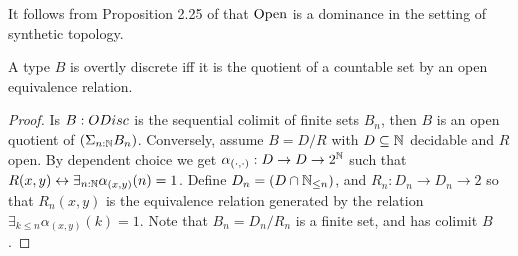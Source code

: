 \begin{remark}\label{OpenDominance}
  It follows from  Proposition 2.25 of \cite{SyntheticTopologyLesnik} that 
  $\mathrm{Open}$ is a dominance in the setting of synthetic topology. 
\end{remark}

\begin{lemma}\label{OdiscQuotientCountableByOpen}\label{ODiscEqualityOpen}
  A type $B$ is overtly discrete iff it is the quotient of a countable set by an open equivalence relation. 
\end{lemma}
\begin{proof}
  Is $B:\ODisc$ is the sequential colimit of finite sets $B_n$, 
  then $B$ is an open quotient of $ (\Sigma_{n:\mathbb{N}} B_n)$.
%
  Conversely, assume $B= D/R$ with $D\subseteq \mathbb{N}$ decidable and $R$ open. 
  By dependent choice we get $\alpha_{(\cdot,\cdot)}:D \to D \to 2^{\mathbb{N}}$ such that 
  $R(x,y)\leftrightarrow \exists_{n:\mathbb{N}}\alpha_{(x,y)}(n) = 1$. 
  Define $D_n = (D \cap \mathbb{N}_{\leq n})$, and $R_n : D_n \to D_n \to 2$ so that 
  $R_n(x,y)$ is the equivalence relation generated by the relation 
  $\exists_{k\leq n} \alpha_{(x,y)}(k) =1$. 
  Note that $B_n = D_n/R_n$ is a finite set, and has colimit $B$. 
\end{proof}

